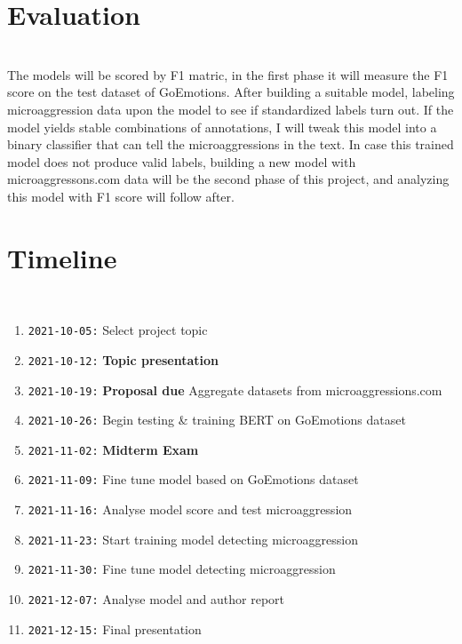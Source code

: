 \documentclass[12pt]{main}
\begin{document}
\section*{Evaluation}
\\
The models will be scored by F1 matric, in the first phase it will measure the F1 score
on the test dataset of GoEmotions. After building a suitable model,
labeling microaggression data upon the model to see if standardized labels turn out.
If the model yields stable combinations of annotations, I will tweak this model into a binary classifier
that can tell the microaggressions in the text.
In case this trained model does not produce valid labels,
building a new model with microaggressons.com data will be the second phase of this project,
and analyzing this model with F1 score will follow after.


\section*{Timeline}
\\
\begin{enumerate}[label={}]
  \item \hspace{-10mm}\texttt{2021-10-05:} Select project topic
  \item \hspace{-10mm}\texttt{2021-10-12:} \textbf{Topic presentation}
  \item \hspace{-10mm}\texttt{2021-10-19:} \textbf{Proposal due} Aggregate datasets from microaggressions.com
  \item \hspace{-10mm}\texttt{2021-10-26:} Begin testing \& training BERT on GoEmotions dataset
  \item \hspace{-10mm}\texttt{2021-11-02:} \textbf{Midterm Exam}
  \item \hspace{-10mm}\texttt{2021-11-09:} Fine tune model based on GoEmotions dataset
  \item \hspace{-10mm}\texttt{2021-11-16:} Analyse model score and test microaggression
  \item \hspace{-10mm}\texttt{2021-11-23:} Start training model detecting microaggression
  \item \hspace{-10mm}\texttt{2021-11-30:} Fine tune model detecting microaggression
  \item \hspace{-10mm}\texttt{2021-12-07:} Analyse model and author report
  \item \hspace{-10mm}\texttt{2021-12-15:} Final presentation
\end{enumerate}




\end{document}
